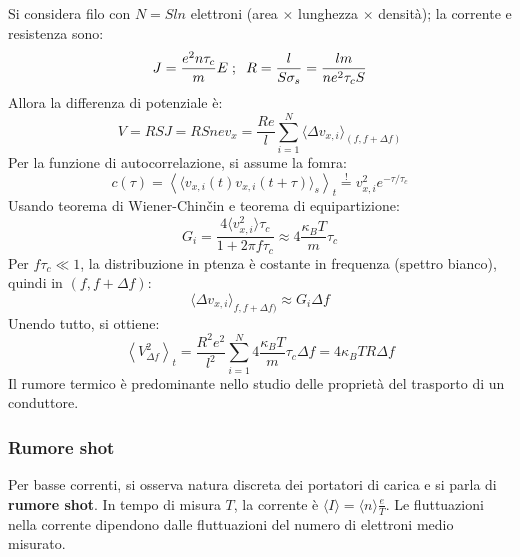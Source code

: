 \documentclass[10pt, a4paper]{scrartcl}
\numberwithin{equation}{subsection}
\theoremstyle{style1}
\begin{document}
Si considera filo con $N = S l n$ elettroni (area $\times $ lunghezza $\times $ densit\`a); la corrente e resistenza sono:
\[
	J = \frac{e^2 n \tau _c }{m}E \hspace{.1cm} ; \hspace{.2cm} R = \frac{l}{S\sigma _s} = \frac{lm}{ne^2 \tau _c S}
\] 
Allora la differenza di potenziale \`e:
\[
V = RSJ = RSnev_x = \frac{Re}{l} \sum_{i=1}^{N} \langle \Delta v_{x,i}  \rangle_{(f,f+\Delta f)} 
\] 
Per la funzione di autocorrelazione, si assume la fomra:
\[
c(\tau ) = \left\langle \langle v_{x,i} (t) v_{x,i} (t+\tau ) \rangle_s \right\rangle_t \stackrel{!}{=} v_{x,i} ^2 e^{ - \tau  / \tau _c} 
\] 
Usando teorema di Wiener-Chin\v cin e teorema di equipartizione:
\begin{equation}
	G_i = \frac{4 \langle v_{x,i} ^2 \rangle\tau _c}{1+ 2 \pi f \tau _c} \approx 4 \frac{\kappa _B T}{m}\tau _c
\end{equation}
Per $f\tau _c \ll 1$, la distribuzione in ptenza \`e costante in frequenza (spettro bianco), quindi in $(f,f+\Delta f)$:
\[
\langle \Delta v_{x,i}  \rangle_{f,f+\Delta f)} \approx G_i \Delta f
\] 
Unendo tutto, si ottiene:
\begin{equation}
	\left\langle V^2_{\Delta f}  \right\rangle_t = \frac{R^2 e^2}{l^2} \sum_{i=1}^{N} 4 \frac{\kappa _B T}{m}\tau_c \Delta f = 4 \kappa _B T R \Delta f
\end{equation}
Il rumore termico \`e predominante nello studio delle propriet\`a del trasporto di un conduttore.

\subsubsection{Rumore shot}

Per basse correnti, si osserva natura discreta dei portatori di carica e si parla di \textbf{rumore shot}. 
In tempo di misura $T$, la corrente \`e $\langle I \rangle = \langle n \rangle \frac{e}{T}$.
Le fluttuazioni nella corrente dipendono dalle fluttuazioni del numero di elettroni medio misurato.
\end{document}
